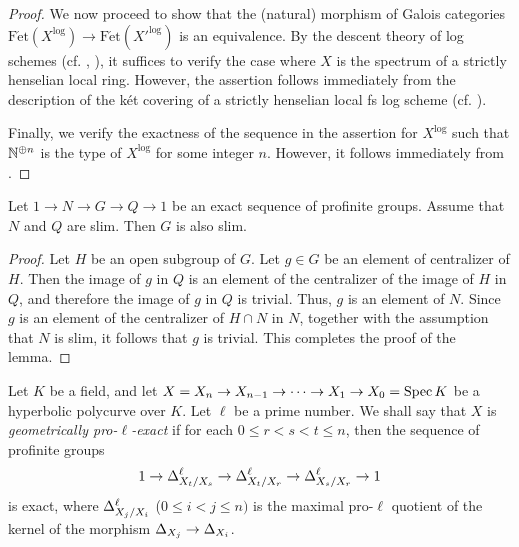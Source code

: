 \begin{proof}
  We now proceed to show that the (natural) morphism of Galois categories $\mathrm{F\acute{e}t}(X^\log) \to \mathrm{F\acute{e}t}(X'^\log)$ is an equivalence. By the descent theory of log schemes (cf. \cite[Proposition 4.4]{Vidal}, \cite[Proposition B.8]{Hoshi1}), it suffices to verify the case where $X$ is the spectrum of a strictly henselian local ring. However, the assertion follows immediately from the description of the k\'{e}t covering of a strictly henselian local fs log scheme (cf. \cite[Proposition B.2]{Hoshi1}).

  Finally, we verify the exactness of the sequence in the assertion for $X^\log$ such that $\mathbb{N}^{\oplus n}$ is the type of $X^\log$ for some integer $n$. However, it follows immediately from \cite[Corollary 2]{Hoshi1}.
\end{proof}



\begin{lem}\label{SlimnessOfExtensionGroupOfSlimGroups}
  Let $1 \to N \to G \to Q \to 1$ be an exact sequence of profinite groups. Assume that $N$ and $Q$ are slim. Then $G$ is also slim.
\end{lem}
\begin{proof}
  Let $H$ be an open subgroup of $G$. Let $g \in G$ be an element of centralizer of $H$. Then the image of $g$ in $Q$ is an element of the centralizer of the image of $H$ in $Q$, and therefore the image of $g$ in $Q$ is trivial. Thus, $g$ is an element of $N$. Since $g$ is an element of the centralizer of $H \cap N$ in $N$, together with the assumption that $N$ is slim, it follows that $g$ is trivial. This completes the proof of the lemma.
\end{proof}

\begin{defn}
  Let $K$ be a field, and let $X = X_n \to X_{n - 1} \to \cdots \to X_1 \to X_0 = \mathrm{Spec} \, K$ be a hyperbolic polycurve over $K$. Let $\ell$ be a prime number. We shall say that $X$ is \emph{geometrically pro-$\ell$-exact} if for each $0 \leq r < s < t \leq n$, then the sequence of profinite groups
    \[
      1 \to \Delta_{X_t / X_s}^\ell \to \Delta_{X_t / X_r}^\ell \to \Delta_{X_s / X_r}^\ell \to 1
    \]
    is exact, where $\Delta_{X_j / X_i}^\ell$ ($0 \leq i < j \leq n)$ is the maximal pro-$\ell$ quotient of the kernel of the morphism $\Delta_{X_j} \to \Delta_{X_i}$.
\end{defn}

